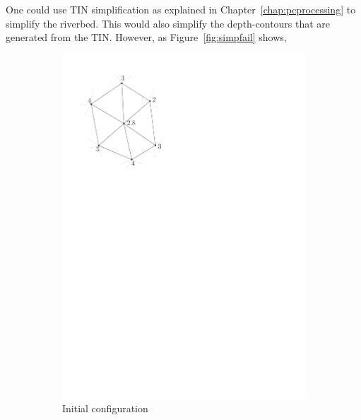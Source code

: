 One could use TIN simplification as explained in Chapter~\ref{chap:pcprocessing} to simplify the riverbed.
This would also simplify the depth-contours that are generated from the TIN. 
However, as Figure~\ref{fig:simpfail} shows, 
\begin{figure}
\centering
  \begin{subfigure}[b]{0.22\linewidth}
    \centering
    \includegraphics[width=\textwidth,page=1]{figs/simpfail.pdf}
    \caption{Initial configuration}\label{fig:simpfail:a}
  \end{subfigure}
  \qquad
  \begin{subfigure}[b]{0.22\linewidth}
    \centering

\end{subfigure}
\end{figure}
